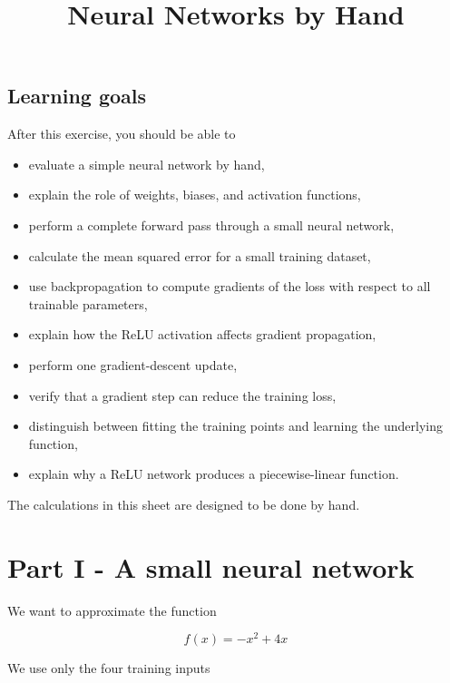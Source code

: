 \documentclass{course_sheet}
\begin{document}
\title{Neural Networks by Hand}
\author{}
\date{}
\maketitle
\subsection*{Learning goals}
After this exercise, you should be able to

\begin{itemize}
\item
evaluate a simple neural network by hand,

\item
explain the role of weights, biases, and activation functions,

\item
perform a complete forward pass through a small neural network,

\item
calculate the mean squared error for a small training dataset,

\item
use backpropagation to compute gradients of the loss with respect to all trainable parameters,

\item
explain how the ReLU activation affects gradient propagation,

\item
perform one gradient-descent update,

\item
verify that a gradient step can reduce the training loss,

\item
distinguish between fitting the training points and learning the underlying function,

\item
explain why a ReLU network produces a piecewise-linear function.

\end{itemize}
The calculations in this sheet are designed to be done by hand.

\clearpage
\section*{Part I - A small neural network}
We want to approximate the function

\[
f(x)=-x^2+4x
\]

We use only the four training inputs
\end{document}
